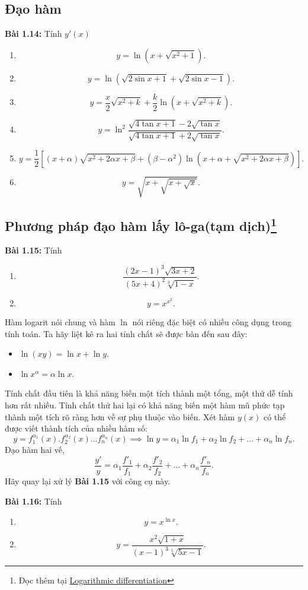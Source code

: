 \subsection*{Đạo hàm}
\textbf{Bài 1.14:} Tính \(y'(x)\)
\begin{enumerate}[label=(\alph*)]
    \item \[y=\ln (x+\sqrt{x^2 +1}).\]
    \item \[y=\ln (\sqrt{2\sin x +1}+\sqrt{2\sin x -1}).\]
    \item \[y=\frac{x}{2}\sqrt{x^2 +k}+\frac{k}{2}\ln (x+\sqrt{x^2 +k}).\]
    \item \[y=\ln^2 \frac{\sqrt{4\tan x +1}-2\sqrt{\tan x}}{\sqrt{4\tan x +1}+2\sqrt{\tan x}}.\]
    \item \[y=\frac{1}{2}[(x+\alpha)\sqrt{x^2 +2\alpha x +\beta}+(\beta -\alpha^2)\ln(x+\alpha+\sqrt{x^2 +2\alpha x+\beta})].\]
    \item \[y=\sqrt{x+\sqrt{x+\sqrt{x}}}.\]
\end{enumerate}

\subsection*{Phương pháp đạo hàm lấy lô-ga(tạm dịch)\footnote{Đọc thêm tại \href{https://en.wikipedia.org/wiki/Logarithmic_differentiation}{Logarithmic differentiation}}}
\textbf{Bài 1.15:} Tính 
\begin{enumerate}[label=(\alph*)]
    \item \[\frac{(2x-1)^3 \sqrt{3x+2}}{(5x+4)^2 \sqrt[3]{1-x}}.\]
    \item \[y=x^{x^2}.\]
\end{enumerate}
Hàm logarit nói chung và hàm \(\ln\) nói riêng đặc biệt có nhiều công dụng trong tính toán. Ta hãy liệt kê ra hai tính chất sẽ được bàn đến sau đây:
\begin{itemize}
    \item \(\ln(xy)=\ln x +\ln y \).
    \item \(\ln x^{\alpha} = \alpha \ln x\).
\end{itemize}
Tính chất đầu tiên là khả năng biến một tích thành một tổng, một thứ dễ tính hơn rất nhiều. Tính chất thứ hai lại có khả năng biến một hàm mũ phức tạp thành một tích rõ ràng hơn về sự phụ thuộc vào biến. \newline
Xét hàm \(y(x)\) có thể được viết thành tích của nhiều hàm số: \[y=f_{1}^{\alpha_1}(x).f_{2}^{\alpha_2}(x)\dots f_{n}^{\alpha_n}(x)\implies \ln y = \alpha_{1}\ln f_1 +\alpha_{2}\ln f_2 +\dots +\alpha_{n}\ln f_n.\]
Đạo hàm hai vế, \[\frac{y'}{y}=\alpha_{1} \frac{f'_1}{f_1}+\alpha_{2} \frac{f'_2}{f_2}+\dots +\alpha_{n} \frac{f'_n}{f_n}.\]
Hãy quay lại xử lý \textbf{Bài 1.15}  với công cụ này.
\vspace{5pt}

\textbf{Bài 1.16:} Tính 
\begin{enumerate}[label=(\alph*)]
  \item \[y=x^{\ln x}.\]  
  \item \[y=\frac{x^2 \sqrt{1+x}}{(x-1)^3 \sqrt[5]{5x-1}}.\]
\end{enumerate}